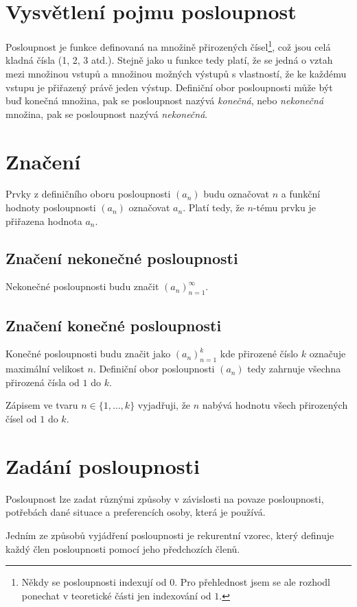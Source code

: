 \documentclass[12pt]{report}			%
\begin{document}
		\section{Vysvětlení pojmu posloupnost}
Posloupnost je funkce definovaná na množině přirozených čísel\footnote{Někdy se posloupnosti indexují od $0$. Pro přehlednost jsem se ale rozhodl ponechat v teoretické části jen indexování od $1$.}, což jsou celá kladná čísla (1, 2, 3 atd.). Stejně jako u funkce tedy platí, že se jedná o vztah mezi množinou vstupů a množinou možných výstupů s vlastností, že ke každému vstupu je přiřazený právě jeden výstup. Definiční obor posloupnosti může být buď konečná množina, pak se posloupnost nazývá \emph{konečná}, nebo \emph{nekonečná} množina, pak se posloupnost nazývá \emph{nekonečná}.
		\section{Značení}
Prvky z definičního oboru posloupnosti $(a_n)$ budu označovat $n$ a funkční hodnoty posloupnosti $(a_n)$ označovat $a_n$. Platí tedy, že $n$-tému prvku je přiřazena hodnota $a_n$.
		\subsection{Značení nekonečné posloupnosti}
Nekonečné posloupnosti budu značit $(a_n)_{n=1}^{\infty} $.
		\subsection{Značení konečné posloupnosti}
Konečné posloupnosti budu značit jako $(a_n)_{n=1}^k$ kde přirozené číslo $k$ označuje maximální velikost $n$. Definiční obor posloupnosti $(a_n)$ tedy zahrnuje všechna přirozená čísla od $1$ do $k$. 

Zápisem ve tvaru $n \in \{1, \dots, k\}$ vyjadřuji, že $n$ nabývá hodnotu všech přirozených čísel od $1$ do $k$.

\section{Zadání posloupnosti}
Posloupnost lze zadat různými způsoby v závislosti na povaze posloupnosti, potřebách dané situace a preferencích osoby, která je používá.

Jedním ze způsobů vyjádření posloupnosti je rekurentní vzorec, který definuje každý člen posloupnosti pomocí jeho předchozích členů. 
\end{document}

